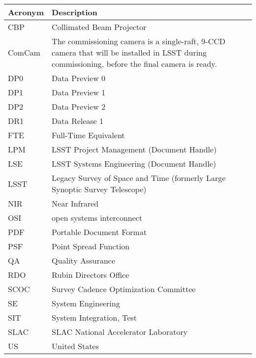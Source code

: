 \addtocounter{table}{-1}
\begin{longtable}{p{}p{}}\hline
\textbf{Acronym} & \textbf{Description}  \\\hline

CBP & Collimated Beam Projector \\\hline
ComCam & The commissioning camera is a single-raft, 9-CCD camera that will be installed in LSST during commissioning, before the final camera is ready. \\\hline
DP0 & Data Preview 0 \\\hline
DP1 & Data Preview 1 \\\hline
DP2 & Data Preview 2 \\\hline
DR1 & Data Release 1 \\\hline
FTE & Full-Time Equivalent \\\hline
LPM & LSST Project Management (Document Handle) \\\hline
LSE & LSST Systems Engineering (Document Handle) \\\hline
LSST & Legacy Survey of Space and Time (formerly Large Synoptic Survey Telescope) \\\hline
NIR & Near Infrared \\\hline
OSI & open systems interconnect \\\hline
PDF & Portable Document Format \\\hline
PSF & Point Spread Function \\\hline
QA & Quality Assurance \\\hline
RDO & Rubin Directors Office \\\hline
SCOC & Survey Cadence Optimization Committee \\\hline
SE & System Engineering \\\hline
SIT & System Integration, Test \\\hline
SLAC & SLAC National Accelerator Laboratory \\\hline
US & United States \\\hline
\end{longtable}

